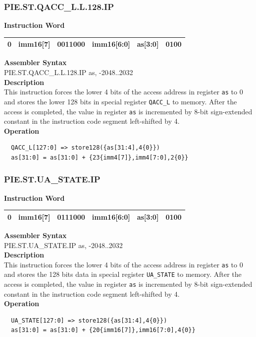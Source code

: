 \newpage
\subsubsection{PIE.ST.QACC\_L.L.128.IP}\label{instruction:PIESTQACCLL128IP}
\setlength\tabcolsep{6pt}
\textbf{Instruction Word} \\
\begin{tabular}{|c|c|c|c|c|c|}
	\hline
	0 & imm16[7] & 0011000 & imm16[6:0] & as[3:0] & 0100 \\
	\hline
\end{tabular}

\textbf{Assembler Syntax} \\
PIE.ST.QACC\_L.L.128.IP as, -2048..2032 \\
\textbf{Description} \\
This instruction forces the lower 4 bits of the access address in register \lstinline{as} to 0 and stores the lower 128 bits in special register \lstinline{QACC_L} to memory. After the access is completed, the value in register \lstinline{as} is incremented by 8-bit sign-extended constant in the instruction code segment left-shifted by 4.\\
\textbf{Operation}
\begin{lstlisting}
  QACC_L[127:0] => store128({as[31:4],4{0}})
  as[31:0] = as[31:0] + {23{imm4[7]},imm4[7:0],2{0}}
\end{lstlisting}

\newpage
\subsubsection{PIE.ST.UA\_STATE.IP}\label{instruction:PIESTUASTATEIP}
\setlength\tabcolsep{6pt}
\textbf{Instruction Word} \\
\begin{tabular}{|c|c|c|c|c|c|}
	\hline
	0 & imm16[7] & 0111000 & imm16[6:0] & as[3:0] & 0100 \\
	\hline
\end{tabular}

\textbf{Assembler Syntax} \\
PIE.ST.UA\_STATE.IP as, -2048..2032 \\
\textbf{Description} \\
This instruction forces the lower 4 bits of the access address in register \lstinline{as} to 0 and stores the 128 bits data in special register \lstinline{UA_STATE} to memory. After the access is completed, the value in register \lstinline{as} is incremented by 8-bit sign-extended constant in the instruction code segment left-shifted by 4.\\
\textbf{Operation}
\begin{lstlisting}
  UA_STATE[127:0] => store128({as[31:4],4{0}})
  as[31:0] = as[31:0] + {20{imm16[7]},imm16[7:0],4{0}}
\end{lstlisting}

